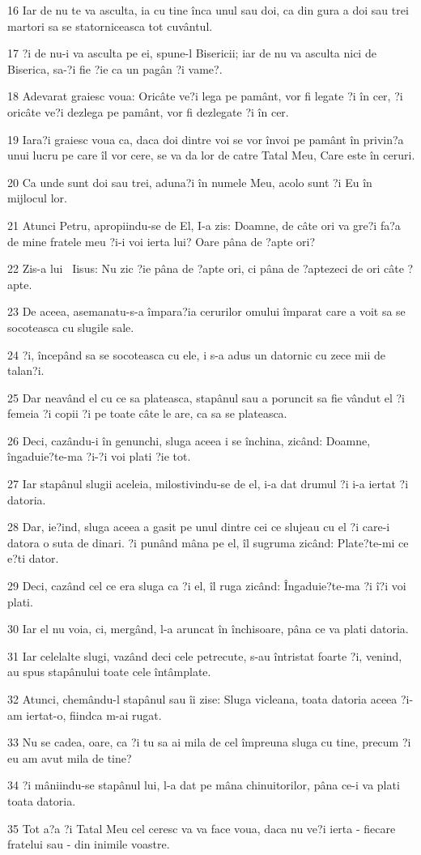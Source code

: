 \par 16 Iar de nu te va asculta, ia cu tine înca unul sau doi, ca din gura a doi sau trei martori sa se statorniceasca tot cuvântul.
\par 17 ?i de nu-i va asculta pe ei, spune-l Bisericii; iar de nu va asculta nici de Biserica, sa-?i fie ?ie ca un pagân ?i vame?.
\par 18 Adevarat graiesc voua: Oricâte ve?i lega pe pamânt, vor fi legate ?i în cer, ?i oricâte ve?i dezlega pe pamânt, vor fi dezlegate ?i în cer.
\par 19 Iara?i graiesc voua ca, daca doi dintre voi se vor învoi pe pamânt în privin?a unui lucru pe care îl vor cere, se va da lor de catre Tatal Meu, Care este în ceruri.
\par 20 Ca unde sunt doi sau trei, aduna?i în numele Meu, acolo sunt ?i Eu în mijlocul lor.
\par 21 Atunci Petru, apropiindu-se de El, I-a zis: Doamne, de câte ori va gre?i fa?a de mine fratele meu ?i-i voi ierta lui? Oare pâna de ?apte ori?
\par 22 Zis-a lui  Iisus: Nu zic ?ie pâna de ?apte ori, ci pâna de ?aptezeci de ori câte ?apte.
\par 23 De aceea, asemanatu-s-a împara?ia cerurilor omului împarat care a voit sa se socoteasca cu slugile sale.
\par 24 ?i, începând sa se socoteasca cu ele, i s-a adus un datornic cu zece mii de talan?i.
\par 25 Dar neavând el cu ce sa plateasca, stapânul sau a poruncit sa fie vândut el ?i femeia ?i copii ?i pe toate câte le are, ca sa se plateasca.
\par 26 Deci, cazându-i în genunchi, sluga aceea i se închina, zicând: Doamne, îngaduie?te-ma ?i-?i voi plati ?ie tot.
\par 27 Iar stapânul slugii aceleia, milostivindu-se de el, i-a dat drumul ?i i-a iertat ?i datoria.
\par 28 Dar, ie?ind, sluga aceea a gasit pe unul dintre cei ce slujeau cu el ?i care-i datora o suta de dinari. ?i punând mâna pe el, îl sugruma zicând: Plate?te-mi ce e?ti dator.
\par 29 Deci, cazând cel ce era sluga ca ?i el, îl ruga zicând: Îngaduie?te-ma ?i î?i voi plati.
\par 30 Iar el nu voia, ci, mergând, l-a aruncat în închisoare, pâna ce va plati datoria.
\par 31 Iar celelalte slugi, vazând deci cele petrecute, s-au întristat foarte ?i, venind, au spus stapânului toate cele întâmplate.
\par 32 Atunci, chemându-l stapânul sau îi zise: Sluga vicleana, toata datoria aceea ?i-am iertat-o, fiindca m-ai rugat.
\par 33 Nu se cadea, oare, ca ?i tu sa ai mila de cel împreuna sluga cu tine, precum ?i eu am avut mila de tine?
\par 34 ?i mâniindu-se stapânul lui, l-a dat pe mâna chinuitorilor, pâna ce-i va plati toata datoria.
\par 35 Tot a?a ?i Tatal Meu cel ceresc va va face voua, daca nu ve?i ierta - fiecare fratelui sau - din inimile voastre.

